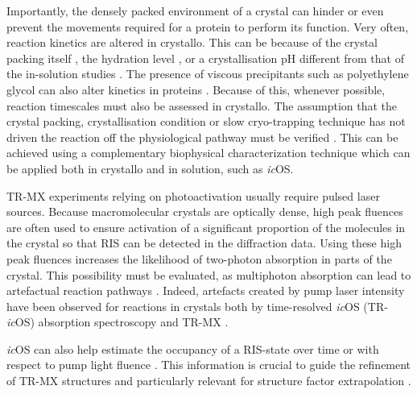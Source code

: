 Importantly, the densely packed environment of a crystal can hinder or even prevent the movements required for a protein to perform its function. Very often, reaction kinetics are altered in crystallo. This can be because of the crystal packing itself \parencite{kortCharacterizationPhotocycleIntermediates2003,konoldConfinementCrystalLattice2020,aumonierSlowProteinDynamics2022}, the hydration level \parencite{efremovTimeResolvedMicrospectroscopySingle2006,konoldConfinementCrystalLattice2020}, or a crystallisation pH different from that of the in-solution studies \parencite{makinenReactivityCryoenzymologyEnzymes1977,mozzarelliProteinFunctionCrystal1996}. The presence of viscous precipitants such as polyethylene glycol can also alter kinetics in proteins \parencite{saxenaProteinDynamicsControl2005}. Because of this, whenever possible, reaction timescales must also be assessed in crystallo. The assumption that the crystal packing, crystallisation condition or slow cryo-trapping technique has not driven the reaction off the physiological pathway must be verified \parencite{wilmot27DefiningRedox2002,caramelloFemtosecondsMinutesTimeresolved2024}. This can be achieved using a complementary biophysical characterization technique which can be applied both in crystallo and in solution, such as \textit{ic}OS.


TR-MX experiments relying on photoactivation usually require pulsed laser sources. Because macromolecular crystals are optically dense, high peak fluences are often used to ensure activation of a significant proportion of the molecules in the crystal so that RIS can be detected in the diffraction data. Using these high peak fluences increases the likelihood of two-photon absorption in parts of the crystal. This possibility must be evaluated, as multiphoton absorption can lead to artefactual reaction pathways \parencite{barendsInfluencePumpLaser2024,bertrandStructuralEffectsHigh2024}. Indeed, artefacts created by pump laser intensity have been observed for reactions in crystals both by time-resolved \textit{ic}OS (TR-\textit{ic}OS) absorption spectroscopy \parencite{engilbergeTRicOSSetupESRF2024} and TR-MX \parencite{barendsInfluencePumpLaser2024}.


\textit{ic}OS can also help estimate the occupancy of a RIS-state over time or with respect to pump light fluence \parencite{engilbergeTRicOSSetupESRF2024}. This information is crucial to guide the refinement of TR-MX structures and particularly relevant for structure factor extrapolation \parencite{dezitterXtrapol8EnablesAutomatic2022,vallejosAppraisingProteinConformational2024}. 


